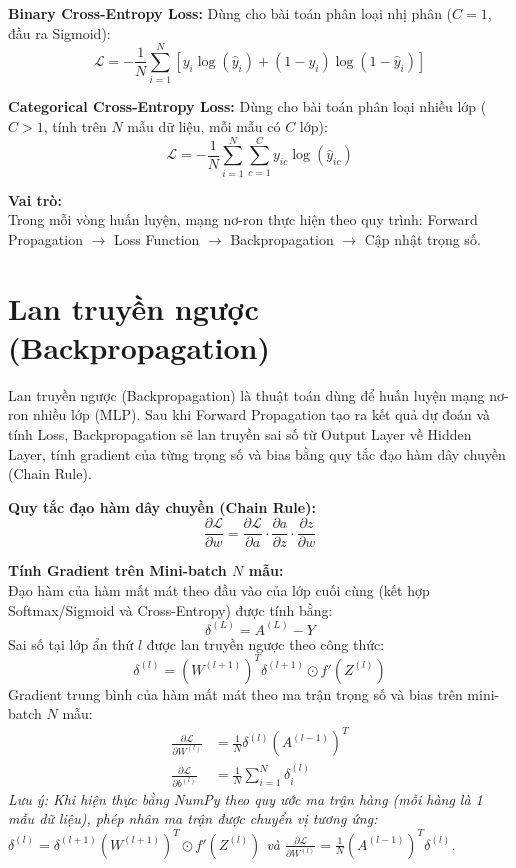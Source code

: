 \documentclass[12pt,a4paper]{report}
\begin{document}
\textbf{Binary Cross-Entropy Loss:} Dùng cho bài toán phân loại nhị phân ($C=1$, đầu ra Sigmoid):
\begin{equation}
    \mathcal{L} = - \frac{1}{N} \sum_{i=1}^N \left[ y_i \log(\hat{y}_i) + (1 - y_i) \log(1 - \hat{y}_i) \right]
\end{equation}

\textbf{Categorical Cross-Entropy Loss:} Dùng cho bài toán phân loại nhiều lớp ($C > 1$, tính trên $N$ mẫu dữ liệu, mỗi mẫu có $C$ lớp):
\begin{equation}
    \mathcal{L} = - \frac{1}{N} \sum_{i=1}^N \sum_{c=1}^C y_{ic} \log(\hat{y}_{ic})
\end{equation}

\textbf{Vai trò:} \\
Trong mỗi vòng huấn luyện, mạng nơ-ron thực hiện theo quy trình: Forward Propagation $\rightarrow$ Loss Function $\rightarrow$ Backpropagation $\rightarrow$ Cập nhật trọng số.

\section{Lan truyền ngược (Backpropagation)}
Lan truyền ngược (Backpropagation) là thuật toán dùng để huấn luyện mạng nơ-ron nhiều lớp (MLP). Sau khi Forward Propagation tạo ra kết quả dự đoán và tính Loss, Backpropagation sẽ lan truyền sai số từ Output Layer về Hidden Layer, tính gradient của từng trọng số và bias bằng quy tắc đạo hàm dây chuyền (Chain Rule).

\textbf{Quy tắc đạo hàm dây chuyền (Chain Rule):}
\begin{equation}
    \frac{\partial \mathcal{L}}{\partial w} = \frac{\partial \mathcal{L}}{\partial a} \cdot \frac{\partial a}{\partial z} \cdot \frac{\partial z}{\partial w}
\end{equation}

\textbf{Tính Gradient trên Mini-batch $N$ mẫu:} \\
Đạo hàm của hàm mất mát theo đầu vào của lớp cuối cùng (kết hợp Softmax/Sigmoid và Cross-Entropy) được tính bằng:
\begin{equation}
    \delta^{(L)} = A^{(L)} - Y
\end{equation}
Sai số tại lớp ẩn thứ $l$ được lan truyền ngược theo công thức:
\begin{equation}
    \delta^{(l)} = (W^{(l+1)})^T \delta^{(l+1)} \odot f'(Z^{(l)})
\end{equation}
Gradient trung bình của hàm mất mát theo ma trận trọng số và bias trên mini-batch $N$ mẫu:
\begin{align}
    \frac{\partial \mathcal{L}}{\partial W^{(l)}} &= \frac{1}{N} \delta^{(l)} (A^{(l-1)})^T \\
    \frac{\partial \mathcal{L}}{\partial b^{(l)}} &= \frac{1}{N} \sum_{i=1}^N \delta_i^{(l)}
\end{align}
\textit{Lưu ý: Khi hiện thực bằng NumPy theo quy ước ma trận hàng (mỗi hàng là 1 mẫu dữ liệu), phép nhân ma trận được chuyển vị tương ứng: $\delta^{(l)} = \delta^{(l+1)} (W^{(l+1)})^T \odot f'(Z^{(l)})$ và $\frac{\partial \mathcal{L}}{\partial W^{(l)}} = \frac{1}{N} (A^{(l-1)})^T \delta^{(l)}$.}
\end{document}
